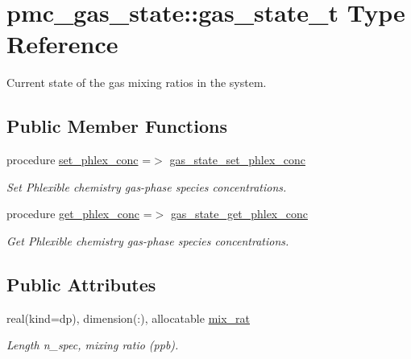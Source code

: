 \hypertarget{structpmc__gas__state_1_1gas__state__t}{}\section{pmc\+\_\+gas\+\_\+state\+:\+:gas\+\_\+state\+\_\+t Type Reference}
\label{structpmc__gas__state_1_1gas__state__t}


Current state of the gas mixing ratios in the system.  


\subsection*{Public Member Functions}
\begin{DoxyCompactItemize}
\item 
procedure \mbox{\hyperlink{structpmc__gas__state_1_1gas__state__t_a5e0cad2789495f361bd9d62812f36a2a}{set\+\_\+phlex\+\_\+conc}} =$>$ \mbox{\hyperlink{namespacepmc__gas__state_a4bb5e19ab85b92dac65f973abcfcc416}{gas\+\_\+state\+\_\+set\+\_\+phlex\+\_\+conc}}
\begin{DoxyCompactList}\small\item\em Set Phlexible chemistry gas-\/phase species concentrations. \end{DoxyCompactList}\item 
procedure \mbox{\hyperlink{structpmc__gas__state_1_1gas__state__t_a55b6048e16efa6da29cb99d7796abec8}{get\+\_\+phlex\+\_\+conc}} =$>$ \mbox{\hyperlink{namespacepmc__gas__state_a93dce5fa598274335861553be37d27f0}{gas\+\_\+state\+\_\+get\+\_\+phlex\+\_\+conc}}
\begin{DoxyCompactList}\small\item\em Get Phlexible chemistry gas-\/phase species concentrations. \end{DoxyCompactList}\end{DoxyCompactItemize}
\subsection*{Public Attributes}
\begin{DoxyCompactItemize}
\item 
real(kind=dp), dimension(\+:), allocatable \mbox{\hyperlink{structpmc__gas__state_1_1gas__state__t_a567c8021551389cf37bf215043ef2f90}{mix\+\_\+rat}}
\begin{DoxyCompactList}\small\item\em Length n\+\_\+spec, mixing ratio (ppb). \end{DoxyCompactList}\end{DoxyCompactItemize}


